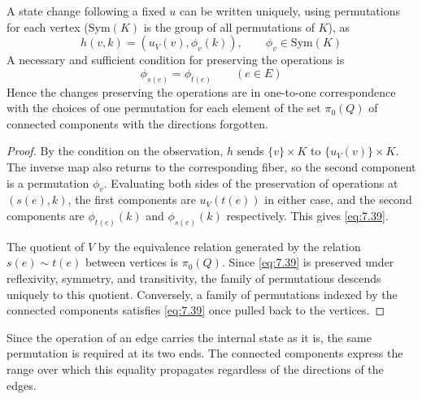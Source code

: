 \begin{theorem}\label{thm:7.24}

A state change following a fixed $u$ can be written uniquely, using permutations for each
vertex ($\mathrm{Sym}(K)$ is the group of all permutations of $K$), as
\begin{equation*}
h(v,k)=(u_V(v),\phi_v(k)),\qquad \phi_v\in\mathrm{Sym}(K)
\tag{7.38}\label{eq:7.38}
\end{equation*}
A necessary and sufficient condition for preserving the operations is
\begin{equation*}
\phi_{s(e)}=\phi_{t(e)}\qquad(e\in E)
\tag{7.39}\label{eq:7.39}
\end{equation*}
Hence the changes preserving the operations are in one-to-one correspondence with the
choices of one permutation for each element of the set $\pi_0(Q)$ of connected components
with the directions forgotten.

\end{theorem}

\begin{proof}

By the condition on the observation, $h$ sends $\{v\}\times K$ to $\{u_V(v)\}\times K$.
The inverse map also returns to the corresponding fiber, so the second component is a
permutation $\phi_v$.
Evaluating both sides of the preservation of operations at $(s(e),k)$, the first components
are $u_V(t(e))$ in either case, and the second components are $\phi_{t(e)}(k)$ and
$\phi_{s(e)}(k)$ respectively.
This gives \eqref{eq:7.39}.

The quotient of $V$ by the equivalence relation generated by the relation $s(e)\sim t(e)$
between vertices is $\pi_0(Q)$.
Since \eqref{eq:7.39} is preserved under reflexivity, symmetry, and transitivity, the family
of permutations descends uniquely to this quotient.
Conversely, a family of permutations indexed by the connected components satisfies
\eqref{eq:7.39} once pulled back to the vertices.

\end{proof}

Since the operation of an edge carries the internal state as it is, the same permutation is
required at its two ends.
The connected components express the range over which this equality propagates regardless of
the directions of the edges.

